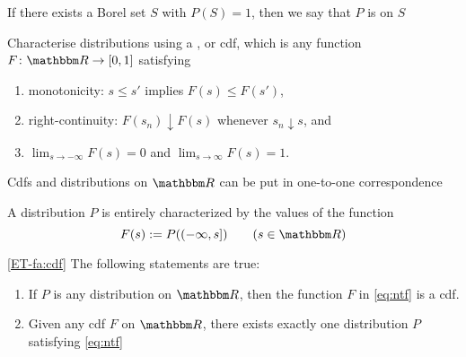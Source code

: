 \begin{frame}

    \vspace{2em}
    If there exists a Borel set $S$
    with $P(S) = 1$, then we say that $P$ is  on $S$
    
    \vspace{1em}
    Characterise distributions using a ,
    or {\sc cdf}, which is any function $F \colon \RR \to [0, 1]$ satisfying
    \begin{enumerate}
        \item monotonicity: $s \leq s'$ implies $F(s) \leq F(s')$,
        \item right-continuity: $F(s_n) \downarrow F(s)$ whenever $s_n \downarrow
            s$, and
        \item $\lim_{s \to -\infty} F(s) = 0$ and $\lim_{s \to \infty} F(s) = 1$.
    \end{enumerate}
    
\end{frame}

\begin{frame}

    \vspace{2em}
    C{\sc df}s and distributions on $\RR$ can be put in one-to-one correspondence
    
    A distribution $P$ is entirely characterized by the values of the function
    \begin{equation}
        \label{eq:ntf}
        F(s) := P( (-\infty, s] )
        \qquad (s \in \RR)
    \end{equation}
    
    \vspace{1em}
    \Fact\eqref{ET-fa:cdf}
    The following statements are true:
    \begin{enumerate}
        \item If $P$ is any distribution on $\RR$, then the function $F$ in
            \eqref{eq:ntf} is a {\sc cdf}.
        \item Given any {\sc cdf} $F$ on $\RR$, there exists exactly one
            distribution $P$ satisfying \eqref{eq:ntf}
    \end{enumerate}
    
\end{frame}

